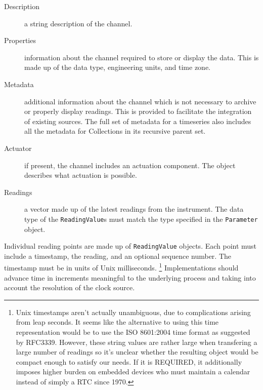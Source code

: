 \documentclass[10pt,letterpaper]{article}
\begin{document}

\begin{description}
\item[Description] a string description of the channel.
\item[Properties] information about the channel required to store or display
  the data.  This is made up of the data type, engineering units, and time
  zone.
\item[Metadata] additional information about the channel which is not
  necessary to archive or properly display readings.  This is provided to
  facilitate the integration of existing sources.  The full set of metadata
  for a timeseries also includes all the metadata for Collections in its
  recursive parent set.
\item[Actuator] if present, the channel includes an actuation component.  The
  object describes what actuation is possible.
\item[Readings] a vector made up of the latest readings from the instrument.
  The data type of the {\tt ReadingValue}s must match the type specified in the
  {\tt Parameter} object.
\end{description}



Individual reading points are made up of {\tt ReadingValue} objects.  Each
point must include a timestamp, the reading, and an optional sequence number.
The timestamp must be in units of Unix milliseconds.  
\footnote{Unix timestamps aren't actually unambiguous, due to complications
  arising from leap seconds.  It seems like the alternative to using this time
  representation would be to use the ISO 8601:2004 time format as suggested by
  RFC3339.  However, these string values are rather large when transfering a
  large number of readings so it's unclear whether the resulting object would
  be compact enough to satisfy our needs.  If it is REQUIRED, it additionally
  imposes higher burden on embedded devices who must maintain a calendar
  instead of simply a RTC since 1970.}
%
Implementations should advance time in increments meaningful to the underlying
process and taking into account the resolution of the clock source.
\end{document}
